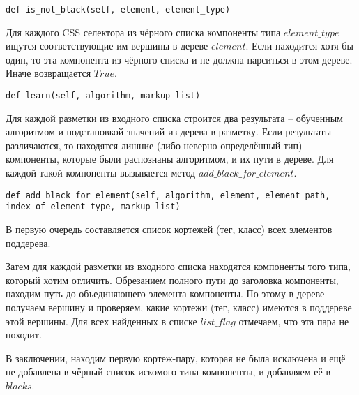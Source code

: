 \begin{lstlisting}
def is_not_black(self, element, element_type)
\end{lstlisting}
Для каждого CSS селектора из чёрного списка компоненты типа $element\_type$ ищутся соответствующие им вершины в дереве $element$. Если находится хотя бы один, то эта компонента из чёрного списка и не должна парситься в этом дереве. Иначе возвращается $True$.
\\

\begin{lstlisting}
def learn(self, algorithm, markup_list)
\end{lstlisting}
Для каждой разметки из входного списка строится два результата -- обученным алгоритмом и подстановкой значений из дерева в разметку. Если результаты различаются, то находятся лишние (либо неверно определённый тип) компоненты, которые были распознаны алгоритмом, и их пути в дереве. Для каждой такой компоненты вызывается метод $add\_black\_for\_element$.
\\

\begin{lstlisting}
def add_black_for_element(self, algorithm, element, element_path, index_of_element_type, markup_list)
\end{lstlisting}
В первую очередь составляется список кортежей (тег, класс) всех элементов поддерева.

Затем для каждой разметки из входного списка находятся компоненты того типа, который хотим отличить. Обрезанием полного пути до заголовка компоненты, находим путь до объединяющего элемента компоненты. По этому в дереве получаем вершину и проверяем, какие кортежи (тег, класс) имеются в поддереве этой вершины. Для всех найденных в списке $list\_flag$ отмечаем, что эта пара не походит.

В заключении, находим первую кортеж-пару, которая не была исключена и ещё не добавлена в чёрный список искомого типа компоненты, и добавляем её в $blacks$.
\\


